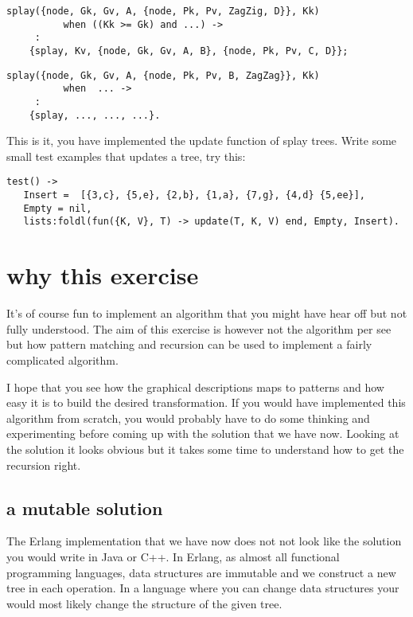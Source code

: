 \documentclass[a4paper,11pt]{article}
\begin{document}
\begin{lstlisting}  
splay({node, Gk, Gv, A, {node, Pk, Pv, ZagZig, D}}, Kk) 
          when ((Kk >= Gk) and ...) ->
     :
    {splay, Kv, {node, Gk, Gv, A, B}, {node, Pk, Pv, C, D}};
\end{lstlisting}
\begin{lstlisting}  
splay({node, Gk, Gv, A, {node, Pk, Pv, B, ZagZag}}, Kk) 
          when  ... ->
     :
    {splay, ..., ..., ...}.
\end{lstlisting}

This is it, you have implemented the update function of splay
trees. Write some small test examples that updates a tree, try this:

\begin{lstlisting}
test() ->
   Insert =  [{3,c}, {5,e}, {2,b}, {1,a}, {7,g}, {4,d} {5,ee}],
   Empty = nil,
   lists:foldl(fun({K, V}, T) -> update(T, K, V) end, Empty, Insert).   
\end{lstlisting}

\section{why this exercise}

It's of course fun to implement an algorithm that you might have hear
off but not fully understood. The aim of this exercise is however not
the algorithm per see but how pattern matching and recursion can be
used to implement a fairly complicated algorithm.

I hope that you see how the graphical descriptions maps to patterns
and how easy it is to build the desired transformation. If you would
have implemented this algorithm from scratch, you would probably have
to do some thinking and experimenting before coming up with the
solution that we have now. Looking at the solution it looks obvious
but it takes some time to understand how to get the recursion right.

\subsection{a mutable solution}

The Erlang implementation that we have now does not not look like the
solution you would write in Java or C++. In Erlang, as almost all
functional programming languages, data structures are immutable and we
construct a new tree in each operation. In a language where you can
change data structures your would most likely change the structure of
the given tree.
\end{document}
